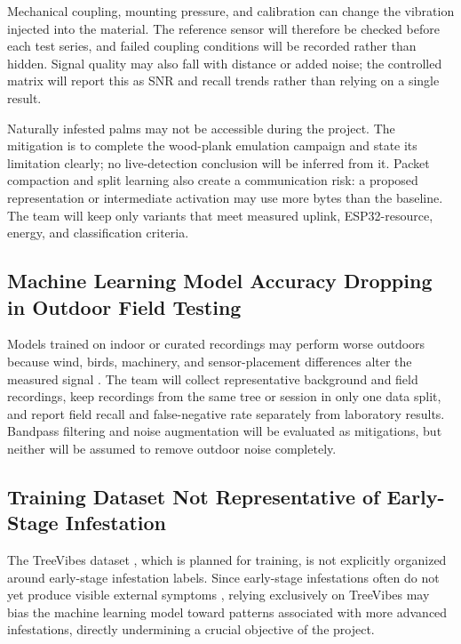 \documentclass[12pt,a4paper,oneside]{memoir}
\newcommand{\newrevision}[1]{\textcolor{green!45!black}{#1}}
\begin{document}
\newrevision{Mechanical coupling, mounting pressure, and calibration can change the vibration injected into the material. The reference sensor will therefore be checked before each test series, and failed coupling conditions will be recorded rather than hidden. Signal quality may also fall with distance or added noise; the controlled matrix will report this as SNR and recall trends rather than relying on a single result.}

\newrevision{Naturally infested palms may not be accessible during the project. The mitigation is to complete the wood-plank emulation campaign and state its limitation clearly; no live-detection conclusion will be inferred from it. Packet compaction and split learning also create a communication risk: a proposed representation or intermediate activation may use more bytes than the baseline. The team will keep only variants that meet measured uplink, ESP32-resource, energy, and classification criteria.}

\subsection{Machine Learning Model Accuracy Dropping in Outdoor Field Testing}

Models trained on indoor or curated recordings may perform worse outdoors because wind, birds, machinery, and sensor-placement differences alter the measured signal \cite{pinhas2008,rach2013,ashry2022cnn}. The team will collect representative background and field recordings, keep recordings from the same tree or session in only one data split, and report field recall and false-negative rate separately from laboratory results. Bandpass filtering and noise augmentation will be evaluated as mitigations, but neither will be assumed to remove outdoor noise completely.

\subsection{Training Dataset Not Representative of Early-Stage Infestation}

The TreeVibes dataset \cite{rigakis2021}, which is planned for training, is not explicitly organized around early-stage infestation labels. Since early-stage infestations often do not yet produce visible external symptoms \cite{pinhas2008,sutanto2023}, relying exclusively on TreeVibes may bias the machine learning model toward patterns associated with more advanced infestations, directly undermining a crucial objective of the project.
\end{document}
